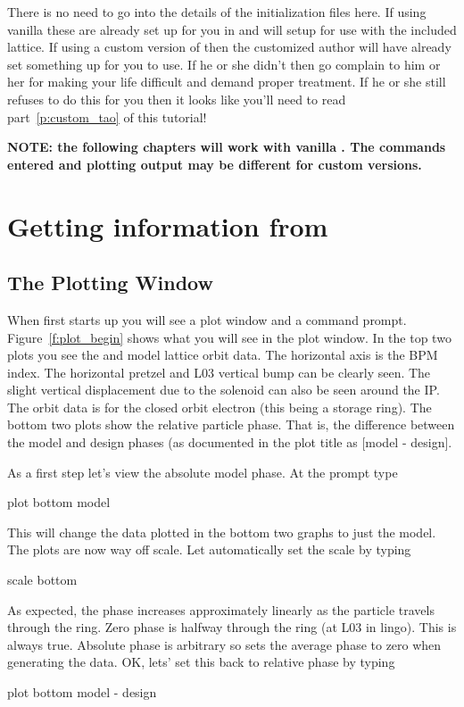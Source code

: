 \documentclass{report}
\begin{document}
There is no need to go into the details of the initialization files here. If
using vanilla \tao these are already set up for you in  and will
setup \tao for use with the included \cesr lattice. If
using a custom version of \tao then the customized \tao author will have already set something
up for you to use. If he or she didn't then go complain to him or her for making
your life difficult and demand proper treatment. If he or she still refuses to
do this for you then it looks like you'll need to read part~\ref{p:custom_tao}
of this tutorial!

\textbf{NOTE: the following chapters will work with vanilla \tao. The commands
entered and plotting output may be different for custom versions.}


\chapter{Getting information from \tao}
\label{c:get_info}

\section{The Plotting Window}

When \tao first starts up you will see a plot window and a command prompt. 
Figure~\ref{f:plot_begin} shows what you will see in the plot window. In the top
two plots you see the  and  model lattice orbit data. The horizontal
axis is the \cesr BPM index. The horizontal pretzel and L03 vertical bump can be clearly 
seen. The slight vertical displacement due to the solenoid can also be seen around 
the IP. The orbit data is for the closed orbit electron (this being a storage
ring). The bottom two plots show the relative 
particle phase. That is, the difference
between the model and design phases (as documented in the plot title as [model -
design]. 

As a first step let's view the absolute model phase. At the  prompt type
\begin{example}
  plot bottom model
\end{example}
This will change the data plotted in the bottom two graphs to just the model.
The plots are now way off scale. Let \tao automatically set the scale by typing
\begin{example}
  scale bottom
\end{example}
As expected, the phase increases approximately linearly as the particle travels
through the ring. Zero phase is halfway through the ring (at L03 in \cesr lingo).
This is always true. Absolute phase is arbitrary so \tao sets the average
phase to zero when generating the data. OK, lets' set this back to relative
phase by typing
\begin{example}
  plot bottom model - design
\end{example}
\end{document}
